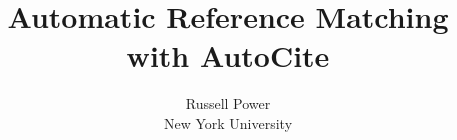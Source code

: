 \documentclass[letterpaper,twocolumn,10pt]{article}
\newcommand{\name}{AutoCite\xspace}
\begin{document}
\date{}

\title{\sffamily\bfseries Automatic Reference Matching with {\name}}
\author{Russell Power \\ New York University}

 
\maketitle







\begin{footnotesize}


\end{footnotesize}
\end{document}
